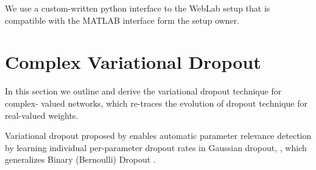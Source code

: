 \documentclass[a4paper,10pt]{article}
\begin{document}
We use a custom-written python interface to the WebLab setup that is compatible with the MATLAB
interface form the setup owner.




\section{Complex Variational Dropout} %
\label{sec:complex_variational_dropout}

In this section we outline and derive the variational dropout technique for complex-%
valued networks, which re-traces the evolution of dropout technique for real-valued
weights.

Variational dropout proposed by \cite{kingma_variational_2015} enables automatic parameter
relevance detection by learning individual per-parameter dropout rates in Gaussian dropout,
\cite{srivastava_dropout_2014,wang_fast_2013}, which generalizes Binary (Bernoulli) Dropout
\cite{hinton_improving_2012}.
\end{document}
